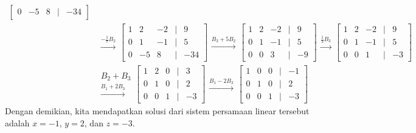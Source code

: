 \documentclass[11pt,openany,a4paper]{article}
\begin{document}
\begin{enumerate}
\begin{align*}
\begin{bmatrix}
              0 & -5 & 8 & | & -34
          \end{bmatrix}\\
          &\begin{matrix}
            \xrightarrow{-\frac{1}{7}B_2}
          \end{matrix}
          \begin{bmatrix}
              1 & 2 & -2 & | & 9 \\
              0 & 1 & -1 & | & 5 \\
              0 & -5 & 8 & | & -34
          \end{bmatrix}
          \begin{matrix}
              \xrightarrow{B_3 + 5B_2}
          \end{matrix}
          \begin{bmatrix}
              1 & 2 & -2 & | & 9 \\
              0 & 1 & -1 & | & 5 \\
              0 & 0 & 3 & | & -9
          \end{bmatrix}
          \begin{matrix}
              \xrightarrow{\frac{1}{3}B_3}
          \end{matrix}
          \begin{bmatrix}
              1 & 2 & -2 & | & 9 \\
              0 & 1 & -1 & | & 5 \\
              0 & 0 & 1 & | & -3
          \end{bmatrix}\\
          &\begin{matrix}
              {\scriptstyle B_2 + B_3}\\
              \xrightarrow{B_1 + 2B_3}
          \end{matrix}
          \begin{bmatrix}
              1 & 2 & 0 & | & 3 \\
              0 & 1 & 0 & | & 2 \\
              0 & 0 & 1 & | & -3
          \end{bmatrix}
          \begin{matrix}
              \xrightarrow{B_1-2B_2}
          \end{matrix}
          \begin{bmatrix}
              1 & 0 & 0 & | & -1 \\
              0 & 1 & 0 & | & 2 \\
              0 & 0 & 1 & | & -3
          \end{bmatrix}
        \end{align*}
        Dengan demikian, kita mendapatkan solusi dari sistem persamaan linear tersebut adalah $x = -1$, $y = 2$, dan $z = -3$.
    \end{enumerate}
\end{document}
